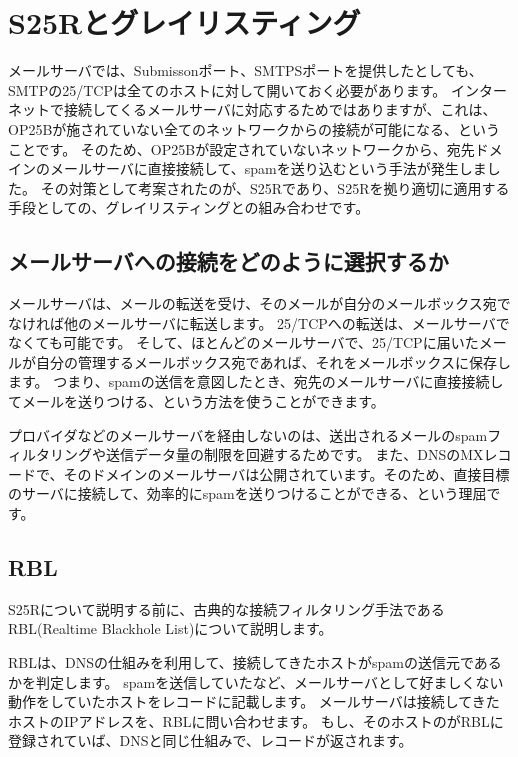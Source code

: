 \section{S25Rとグレイリスティング}

メールサーバでは、Submissonポート、SMTPSポートを提供したとしても、SMTPの25/TCPは全てのホストに対して開いておく必要があります。
インターネットで接続してくるメールサーバに対応するためではありますが、これは、OP25Bが施されていない全てのネットワークからの接続が可能になる、ということです。
そのため、OP25Bが設定されていないネットワークから、宛先ドメインのメールサーバに直接接続して、spamを送り込むという手法が発生しました。
その対策として考案されたのが、S25Rであり、S25Rを拠り適切に適用する手段としての、グレイリスティングとの組み合わせです。

\subsection{メールサーバへの接続をどのように選択するか}

メールサーバは、メールの転送を受け、そのメールが自分のメールボックス宛でなければ他のメールサーバに転送します。
25/TCPへの転送は、メールサーバでなくても可能です。
そして、ほとんどのメールサーバで、25/TCPに届いたメールが自分の管理するメールボックス宛であれば、それをメールボックスに保存します。
つまり、spamの送信を意図したとき、宛先のメールサーバに直接接続してメールを送りつける、という方法を使うことができます。

プロバイダなどのメールサーバを経由しないのは、送出されるメールのspamフィルタリングや送信データ量の制限を回避するためです。
また、DNSのMXレコードで、そのドメインのメールサーバは公開されています。そのため、直接目標のサーバに接続して、効率的にspamを送りつけることができる、という理屈です。

\subsection{RBL}

S25Rについて説明する前に、古典的な接続フィルタリング手法であるRBL(Realtime Blackhole List)について説明します。

RBLは、DNSの仕組みを利用して、接続してきたホストがspamの送信元であるかを判定します。
spamを送信していたなど、メールサーバとして好ましくない動作をしていたホストをレコードに記載します。
メールサーバは接続してきたホストのIPアドレスを、RBLに問い合わせます。
もし、そのホストのがRBLに登録されていば、DNSと同じ仕組みで、レコードが返されます。

